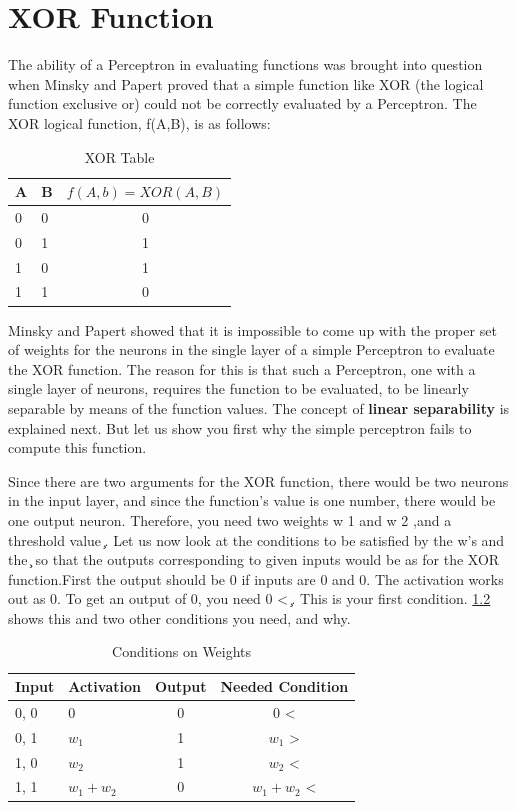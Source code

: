 \chapter{XOR Function}
The ability of a Perceptron in evaluating functions was brought into question
when Minsky and Papert proved that a simple function like XOR (the logical
function exclusive or) could not be correctly evaluated by a Perceptron. The
XOR logical function, f(A,B), is as follows: \\

\begin{table} 
\caption{XOR Table}
\label{tab:xor_table}
\begin{tabular}{|l|l|c|}
\hline
A & B & $f(A,b) = XOR(A,B)$ \\
\hline
0 & 0 & 0 \\ 
\hline
0 & 1 & 1 \\ 
\hline
1 & 0 & 1 \\ 
\hline
1 & 1 & 0 \\ 
\hline
\end{tabular}
\end{table}

Minsky and Papert showed that it is impossible to come up with the proper set of weights for the neurons in the single layer of a simple Perceptron to evaluate the XOR function. The reason for this is that such a Perceptron, one with a single layer of neurons, requires the function to be evaluated, to be linearly separable by means of the function values. The concept of \textbf{linear separability} is explained next. But let us show you first why the simple perceptron fails to compute this function.

Since there are two arguments for the XOR function, there would be two
neurons in the input layer, and since the function’s value is one number, there would be one output neuron. Therefore, you need two weights w 1 and w 2 ,and a threshold value  ̧. Let us now look at the conditions to be satisfied by the w’s and the  ̧ so that the outputs corresponding to given inputs would be as for the XOR function.First the output should be 0 if inputs are 0 and 0. The activation works out as 0. To get an output of 0, you need 0 <  ̧. This is your first condition. \ref{tab:conditions_on_weights} shows this and two other conditions you need, and why.

\begin{table} 
\caption{Conditions on Weights}
\label{tab:conditions_on_weights}
\begin{tabular}{|l|l|c|c|}
\hline
Input & Activation & Output & Needed Condition  \\
\hline
0, 0  & 0          & 0      & 0 <               \\ 
\hline
0, 1  & $w_1$      & 1      & $w_1$ >           \\ 
\hline
1, 0  & $w_2$      & 1      & $w_2$ <            \\ 
\hline
1, 1  & $w_1 + w_2$ & 0      & $w_1 + w_2$ <       \\ 
\hline
\end{tabular}
\end{table}

